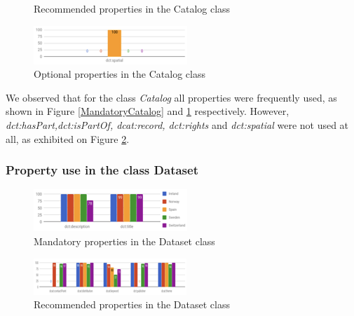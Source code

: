 \documentclass[<options>]{elsarticle}
\begin{document}
\begin{figure}[H]
\caption{Recommended properties in the Catalog class}
\label{RecommendedCatalog}
\end{figure}

\begin{figure}[H]
\includegraphics{Replace6.png}
\caption{Optional properties in the Catalog class}
\label{OptionalCatalog}
\end{figure}

We observed that for the class \textit{Catalog} all properties were frequently used, as shown in Figure \ref{MandatoryCatalog} and \ref{RecommendedCatalog} respectively. However, \textit{dct:hasPart,dct:isPartOf, dcat:record, dct:rights} and \textit{dct:spatial} were not used at all, as exhibited on Figure \ref{OptionalCatalog}.

\subsubsection*{Property use in the class Dataset}

\begin{figure}[H]
\includegraphics{replace7.png}
\caption{Mandatory properties in the Dataset class}
\end{figure}

\begin{figure}[H]
\includegraphics{replace8.png}
\caption{Recommended properties in the Dataset class}
\end{figure}
\end{document}
